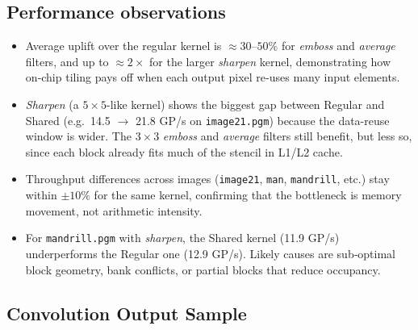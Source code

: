 \subsection{Performance observations}
\begin{itemize}
  \item Average uplift over the regular kernel is \(\approx30\text{–}50\%\) for \textit{emboss} and \textit{average} filters, and up to \(\approx2\times\) for the larger \textit{sharpen} kernel, demonstrating how on‑chip tiling pays off when each output pixel re‑uses many input elements.

  \item \textit{Sharpen} (a \(5{\times}5\)-like kernel) shows the biggest gap between Regular and Shared (e.g.\ 14.5 \(\rightarrow\) 21.8 GP/s on \texttt{image21.pgm}) because the data-reuse window is wider.  
  The \(3{\times}3\) \textit{emboss} and \textit{average} filters still benefit, but less so, since each block already fits much of the stencil in L1/L2 cache.

  \item Throughput differences across images (\texttt{image21}, \texttt{man}, \texttt{mandrill}, etc.) stay within \(\pm10\%\) for the same kernel, confirming that the bottleneck is memory movement, not arithmetic intensity.

  \item For \texttt{mandrill.pgm} with \textit{sharpen}, the Shared kernel (11.9 GP/s) underperforms the Regular one (12.9 GP/s).  
  Likely causes are sub‑optimal block geometry, bank conflicts, or partial blocks that reduce occupancy.
\end{itemize}


\subsection{Convolution Output Sample}

